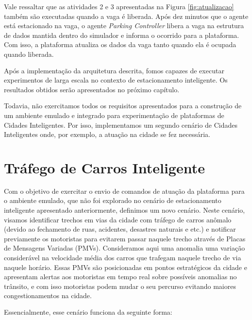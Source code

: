 
Vale ressaltar que as atividades 2 e 3 apresentadas na Figura \ref{fig:atualizacao} também são executadas quando a vaga é liberada.
Após dez minutos que o agente está estacionado na vaga, o agente \textit{Parking Controller} libera a vaga na estrutura de dados mantida dentro do simulador e informa o
ocorrido para a plataforma.
Com isso, a plataforma atualiza os dados da vaga tanto quando ela é ocupada quando liberada.

Após a implementação da arquitetura descrita, fomos capazes de executar experimentos de larga escala no contexto de estacionamento inteligente.
Os resultados obtidos serão apresentados no próximo capítulo.

Todavia, não exercitamos todos os requisitos apresentados para a construção de um ambiente emulado e integrado para experimentação de plataformas de Cidades Inteligentes.
Por isso, implementamos um segundo cenário de Cidades Inteligentes onde, por exemplo, a atuação na cidade se fez necessária.


\section{Tráfego de Carros Inteligente}

Com o objetivo de exercitar o envio de comandos de atuação da plataforma para o ambiente emulado, que não foi explorado no cenário de estacionamento inteligente apresentado
anteriormente, definimos um novo cenário.
Neste cenário, visamos identificar trechos em vias da cidade com tráfego de carros anômalo (devido ao fechamento de ruas, acidentes, desastres naturais e etc.) e notificar
previamente os motoristas para evitarem passar naquele trecho através de Placas de Mensagens Variadas (PMVs).
Consideramos aqui uma anomalia uma variação considerável na velocidade média dos carros que trafegam naquele trecho de via naquele horário.
Essas PMVs são posicionadas em pontos estratégicos da cidade e apresentam alertas aos motoristas em tempo real sobre possíveis anomalias no trânsito, e com isso motoristas
podem mudar o seu percurso evitando maiores congestionamentos na cidade.

Essencialmente, esse cenário funciona da seguinte forma:

